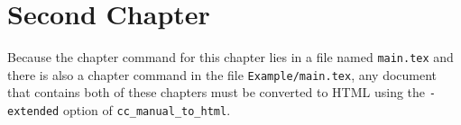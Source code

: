 \chapter{Second Chapter}

Because the chapter command for this chapter lies in a file named
\texttt{main.tex} and there is also a chapter command in the file
\texttt{Example/main.tex}, any document that contains both of these
chapters must be converted to HTML using the \texttt{-extended} option
of \texttt{cc\_manual\_to\_html}.
